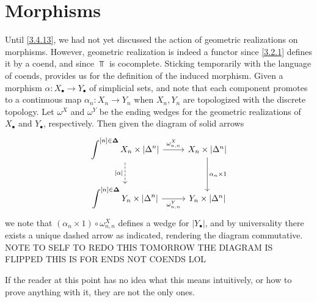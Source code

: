 \section{Morphisms}

Until \cref{3.4.13}, we had not yet discussed the action of geometric realizations on morphisms. However, geometric realization is indeed a functor since \cref{3.2.1} defines it by a coend, and since $\Top $ is cocomplete. Sticking temporarily with the language of coends, \cite[\S IX.7]{ml} provides us for the definition of the induced morphism. Given a morphism $\alpha : X_{\bullet}  \to Y_{\bullet} $ of simplicial sets, and note that each component promotes to a continuous map $\alpha_n : X_n \to Y_n$ when $X_n,Y_n$ are topologized with the discrete topology. Let $\omega^X$ and $\omega^Y$ be the ending wedges for the geometric realizations of $X_{\bullet} $ and $Y_{\bullet} $, respectively. Then given the diagram of solid arrows
\[\begin{tikzcd}[row sep = 2.5em, column sep = 2.5em]
	\displaystyle{\int^{[n]\in\boldsymbol{\Delta} } X_n\times \left| \Delta^n \right| }\ar[" \left| \alpha \right|  "', dashed, d] \ar[" \omega_{n,n} ^X ", r]  & X_n\times \left| \Delta^n \right| \ar[" \alpha_{n} \times 1 ", d]  \\
	\displaystyle{\int^{[n]\in\boldsymbol{\Delta} } Y_n\times \left| \Delta^n \right| }\ar[" \omega_{n,n} ^Y "', r]  & Y_n\times \left| \Delta^n \right| 
\end{tikzcd}\]
we note that $(\alpha_n\times 1)\circ \omega_{n,n} ^X$ defines a wedge for $\left| Y_{\bullet}  \right| $, and by universality there exists a unique dashed arrow as indicated, rendering the diagram commutative. NOTE TO SELF TO REDO THIS TOMORROW THE DIAGRAM IS FLIPPED THIS IS FOR ENDS NOT COENDS LOL

If the reader at this point has no idea what this means intuitively, or how to prove anything with it, they are not the only ones. 
